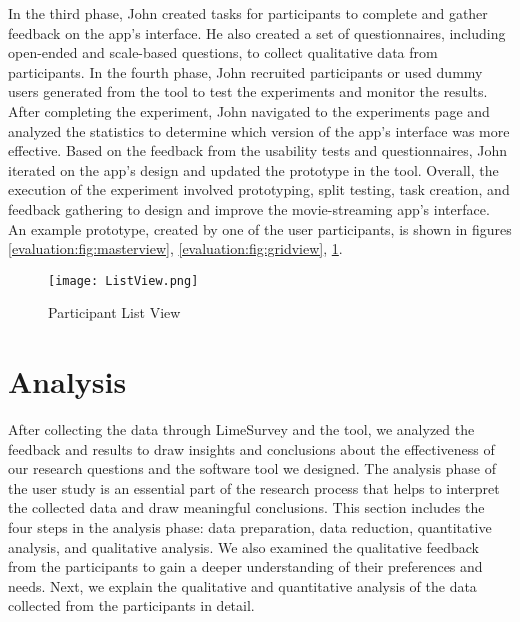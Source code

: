 In the third phase, John created tasks for participants to complete and gather feedback on the app's interface. 
He also created a set of questionnaires, including open-ended and scale-based questions, to collect qualitative data from participants.
In the fourth phase, John recruited participants or used dummy users generated from the tool to test the experiments and monitor the results. 
After completing the experiment, John navigated to the experiments page and analyzed the statistics to determine which version of the app's interface was more effective.
Based on the feedback from the usability tests and questionnaires, John iterated on the app's design and updated the prototype in the tool. 
Overall, the execution of the experiment involved prototyping, split testing, task creation, and feedback gathering to design and improve the movie-streaming app's interface. 
An example prototype, created by one of the user participants, is shown in figures \ref{evaluation:fig:masterview}, \ref{evaluation:fig:gridview}, \ref{evaluation:fig:listview}.
\begin{figure}[ht]
  \centering
  \texttt{[image: ListView.png]}
  \caption[Example Participant Prototype - Screen3]{Participant List View}
  \label{evaluation:fig:listview}
\end{figure}
\clearpage
\section{Analysis}
\label{evaluation:section:analysis}
After collecting the data through LimeSurvey and the tool, we analyzed the feedback and results to draw insights and conclusions about the effectiveness of our research questions and the software tool we designed.
The analysis phase of the user study is an essential part of the research process that helps to interpret the collected data and draw meaningful conclusions. 
This section includes the four steps in the analysis phase: data preparation, data reduction, quantitative analysis, and qualitative analysis.
We also examined the qualitative feedback from the participants to gain a deeper understanding of their preferences and needs. 
Next, we explain the qualitative and quantitative analysis of the data collected from the participants in detail.

